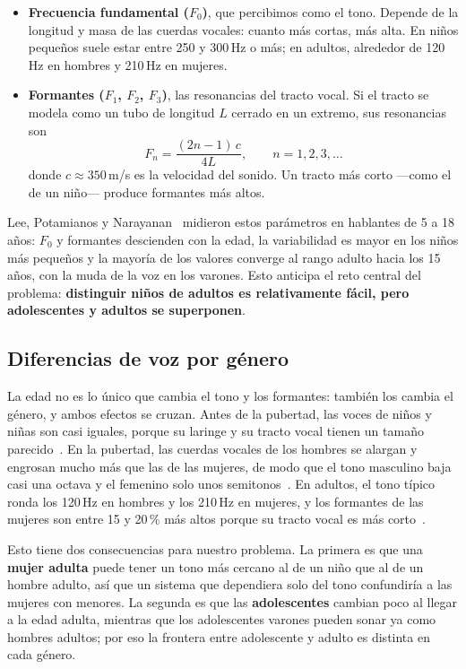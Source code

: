 \documentclass[11pt,a4paper]{article}
\begin{document}
\begin{itemize}
  \item \textbf{Frecuencia fundamental ($F_0$)}, que percibimos como el tono. Depende de la longitud y masa de las cuerdas vocales: cuanto más cortas, más alta. En niños pequeños suele estar entre 250 y 300\,Hz o más; en adultos, alrededor de 120\,Hz en hombres y 210\,Hz en mujeres.
  \item \textbf{Formantes ($F_1$, $F_2$, $F_3$)}, las resonancias del tracto vocal. Si el tracto se modela como un tubo de longitud $L$ cerrado en un extremo, sus resonancias son
  \begin{equation}
    F_n = \frac{(2n-1)\,c}{4L}, \qquad n = 1, 2, 3, \dots
  \end{equation}
  donde $c \approx 350$\,m/s es la velocidad del sonido. Un tracto más corto ---como el de un niño--- produce formantes más altos.
\end{itemize}

Lee, Potamianos y Narayanan~\cite{lee1999} midieron estos parámetros en hablantes de 5 a 18 años: $F_0$ y formantes descienden con la edad, la variabilidad es mayor en los niños más pequeños y la mayoría de los valores converge al rango adulto hacia los 15 años, con la muda de la voz en los varones. Esto anticipa el reto central del problema: \textbf{distinguir niños de adultos es relativamente fácil, pero adolescentes y adultos se superponen}.

\subsection{Diferencias de voz por género}
\label{sec:genero_teoria}

La edad no es lo único que cambia el tono y los formantes: también los cambia el género, y ambos efectos se cruzan. Antes de la pubertad, las voces de niños y niñas son casi iguales, porque su laringe y su tracto vocal tienen un tamaño parecido~\cite{lee1999}. En la pubertad, las cuerdas vocales de los hombres se alargan y engrosan mucho más que las de las mujeres, de modo que el tono masculino baja casi una octava y el femenino solo unos semitonos~\cite{titze1989}. En adultos, el tono típico ronda los 120\,Hz en hombres y los 210\,Hz en mujeres, y los formantes de las mujeres son entre 15 y 20\,\% más altos porque su tracto vocal es más corto~\cite{hillenbrand1995}.

Esto tiene dos consecuencias para nuestro problema. La primera es que una \textbf{mujer adulta} puede tener un tono más cercano al de un niño que al de un hombre adulto, así que un sistema que dependiera solo del tono confundiría a las mujeres con menores. La segunda es que las \textbf{adolescentes} cambian poco al llegar a la edad adulta, mientras que los adolescentes varones pueden sonar ya como hombres adultos; por eso la frontera entre adolescente y adulto es distinta en cada género.
\end{document}
